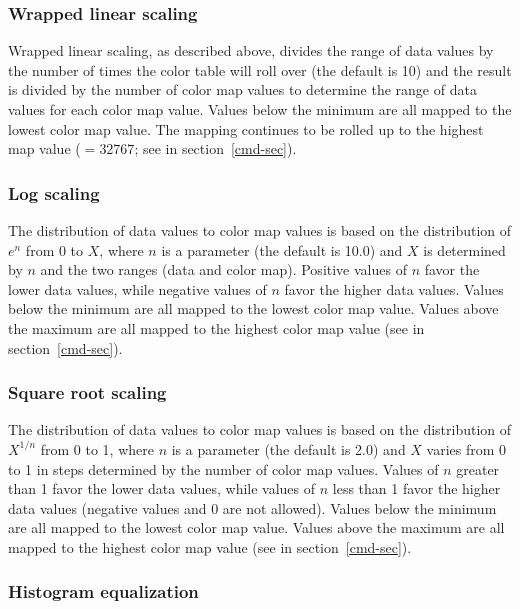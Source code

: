 \subsubsection{ Wrapped linear scaling } \label{wrapscale-sec}

Wrapped linear scaling, as described above, divides the range of data
values by the number of times the color table will roll over (the
default is 10) and the result is divided by the number of color map
values to determine the range of data values for each color map value.
Values below the minimum are all mapped to the lowest color map value.
The mapping continues to be rolled up to the highest map value
($=32767$; see  in section~\ref{cmd-sec}).

\subsubsection{ Log scaling } \label{logscale-sec}

The distribution of data values to color map values is based on the
distribution of $e^n$ from 0 to $X$, where $n$ is a
parameter (the default is 10.0) and $X$ is determined by $n$
and the two ranges (data and color map).  Positive values of $n$
favor the lower data values, while negative values of $n$ favor
the higher data values.  Values below the minimum are all mapped 
to the lowest color map value.  Values above the maximum are all mapped to
the highest color map value (see  in section~\ref{cmd-sec}).

\subsubsection{ Square root scaling } \label{sqrtscale-sec}

The distribution of data values to color map values is based on the
distribution of $X^{1/n}$ from 0 to 1, where $n$ is a
parameter (the default is 2.0) and $X$ varies from 0 to 1 in steps
determined by the number of color map values.  Values of $n$
greater than 1 favor the lower data values, while values of $n$
less than 1 favor the higher data values (negative values and 0 are
not allowed).  Values below the minimum are all mapped to the lowest
color map value.  Values above the maximum are all mapped to the
highest color map value (see  in section~\ref{cmd-sec}).

\subsubsection{ Histogram equalization } \label{histscale-sec}


